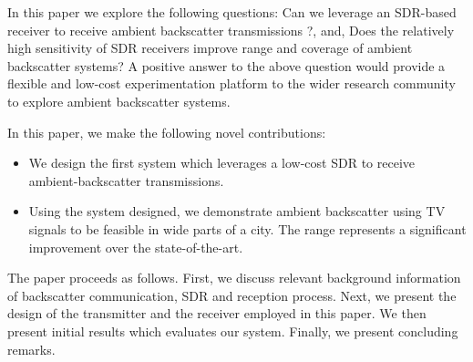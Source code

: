 In this paper we explore the following questions: Can we leverage an
SDR-based receiver to receive ambient backscatter transmissions ?, and, Does the  
relatively high sensitivity of SDR receivers improve
range and coverage of ambient backscatter systems? A positive answer to the above question would provide a
flexible and low-cost experimentation platform to the wider research community to explore ambient backscatter
systems.

  In this paper, we make the following novel contributions:

\begin{itemize}
		

				\item We design the first system which leverages a  low-cost 
					  SDR to receive ambient-backscatter transmissions. 
				\item  Using the system designed, we demonstrate ambient backscatter using TV signals
					   to be feasible in wide parts of a city. The range represents a significant improvement
					   over the state-of-the-art.
				
\end{itemize}

The paper proceeds as follows. First, we discuss relevant background information of backscatter communication,
SDR and reception process. Next, we present the design of the transmitter and the receiver employed in this
paper. We then present initial results which evaluates our system. Finally, we present concluding remarks.
